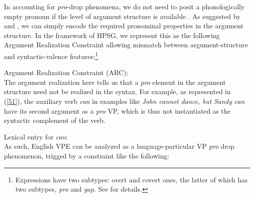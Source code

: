 \documentclass[output=paper
                ,modfonts
                ,nonflat
	        ,collection
	        ,collectionchapter
	        ,collectiontoclongg
 	        ,biblatex
                ,babelshorthands
                ,newtxmath
                ,draftmode
                ,colorlinks, citecolor=brown
]{./langsci/langscibook}
\begin{document}
{In accounting for {\it pro}-drop phenomena, we do not need to posit a phonologically empty pronoun if the level of argument structure is
available \citep[see][]{Bresnan1982a}.  As suggested by \citet{Kim2015}
and \citet{Ginzburg2018}, we can simply encode the required pronominal properties in the argument structure. In the framework of HPSG, we represent this as the following Argument Realization Constraint allowing mismatch between argument-structure and syntactic-valence features:\footnote{Expressions have two subtypes: overt and covert ones, the latter of which has two subtypes, \emph{pro} and \emph{gap}. See \citet{Sag2012a} for details.}

\ea
\label{50}
Argument Realization Constraint (ARC):\\
 \impl
{}
\z
The argument realization here tells us that a \emph{pro} element
in the argument structure need not be realized in the syntax.
 For
example, as represented in (\ref{51}), the auxiliary
verb \emph{can} in examples like \emph{John cannot dance, but Sandy can}
have its second argument as a \emph{pro} VP, which is
thus not instantiated as the syntactic
complement of the verb. 

\ea
\label{51}
Lexical entry for \emph{can}:\\
\z
%
%
As such, English VPE can be analyzed as a language-particular VP \emph{pro} drop phenomenon, trigged
by a constraint like the following:

}
\end{document}

